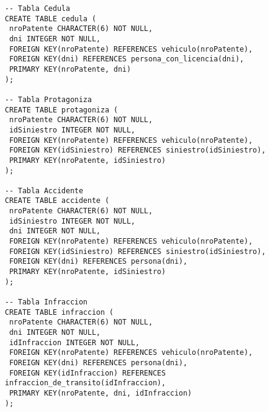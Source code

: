 \begin{verbatim}
-- Tabla Cedula
CREATE TABLE cedula (
 nroPatente CHARACTER(6) NOT NULL,
 dni INTEGER NOT NULL,
 FOREIGN KEY(nroPatente) REFERENCES vehiculo(nroPatente),
 FOREIGN KEY(dni) REFERENCES persona_con_licencia(dni),
 PRIMARY KEY(nroPatente, dni)
);

-- Tabla Protagoniza
CREATE TABLE protagoniza (
 nroPatente CHARACTER(6) NOT NULL,
 idSiniestro INTEGER NOT NULL,
 FOREIGN KEY(nroPatente) REFERENCES vehiculo(nroPatente),
 FOREIGN KEY(idSiniestro) REFERENCES siniestro(idSiniestro),
 PRIMARY KEY(nroPatente, idSiniestro)
);

-- Tabla Accidente
CREATE TABLE accidente (
 nroPatente CHARACTER(6) NOT NULL,
 idSiniestro INTEGER NOT NULL,
 dni INTEGER NOT NULL,
 FOREIGN KEY(nroPatente) REFERENCES vehiculo(nroPatente),
 FOREIGN KEY(idSiniestro) REFERENCES siniestro(idSiniestro),
 FOREIGN KEY(dni) REFERENCES persona(dni), 
 PRIMARY KEY(nroPatente, idSiniestro)
);

-- Tabla Infraccion
CREATE TABLE infraccion (
 nroPatente CHARACTER(6) NOT NULL,
 dni INTEGER NOT NULL,
 idInfraccion INTEGER NOT NULL,
 FOREIGN KEY(nroPatente) REFERENCES vehiculo(nroPatente),
 FOREIGN KEY(dni) REFERENCES persona(dni), 
 FOREIGN KEY(idInfraccion) REFERENCES infraccion_de_transito(idInfraccion), 
 PRIMARY KEY(nroPatente, dni, idInfraccion)
);

\end{verbatim}
